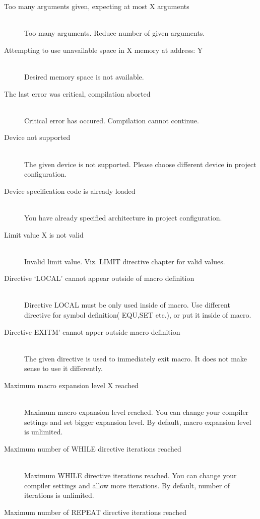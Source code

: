 \begin{description}
            \item[Too many arguments given, expecting at most X arguments]~\\
                Too many arguments. Reduce number of given arguments.
            \item[Attempting to use unavailable space in X memory at address: Y]~\\
                Desired memory space is not available.
            \item[The last error was critical, compilation aborted]~\\
                Critical error has occured. Compilation cannot continue.
            \item[Device not supported]~\\
                The given device is not supported. Please choose different device in project configuration.
            \item[Device specification code is already loaded ]~\\
                You have already specified architecture in project configuration.
            \item[Limit value X is not valid]~\\
                Invalid limit value. Viz. LIMIT directive chapter for valid values.
            \item[Directive `LOCAL' cannot appear outside of macro definition ]~\\
                Directive LOCAL must be only used inside of macro. Use different directive for symbol definition( EQU,SET etc.), or put it inside of macro.
            \item[Directive EXITM' cannot apper outside macro definition]~\\
                The given directive is used to immediately exit macro. It does not make sense to use it differently.
            \item[Maximum macro expansion level X reached]~\\
                Maximum macro expansion level reached. You can change your compiler settings and set bigger expansion level. By default, macro expansion level is unlimited.
            \item[Maximum number of WHILE directive iterations reached]~\\
                Maximum WHILE directive iterations reached. You can change your compiler settings and allow more iterations. By default, number of iterations is unlimited.
            \item[Maximum number of REPEAT directive iterations reached]~\\

\end{description}
